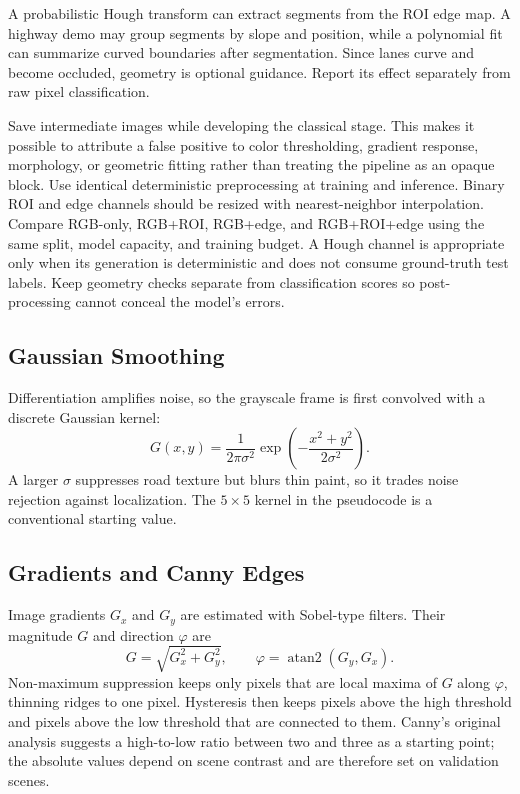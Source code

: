 \documentclass[10pt,a4paper,twocolumn]{article}
\begin{document}
A probabilistic Hough transform can extract segments from the ROI edge map. A highway demo may group segments by slope and position, while a polynomial fit can summarize curved boundaries after segmentation. Since lanes curve and become occluded, geometry is optional guidance. Report its effect separately from raw pixel classification.

Save intermediate images while developing the classical stage. This makes it possible to attribute a false positive to color thresholding, gradient response, morphology, or geometric fitting rather than treating the pipeline as an opaque block. Use identical deterministic preprocessing at training and inference. Binary ROI and edge channels should be resized with nearest-neighbor interpolation. Compare RGB-only, RGB+ROI, RGB+edge, and RGB+ROI+edge using the same split, model capacity, and training budget. A Hough channel is appropriate only when its generation is deterministic and does not consume ground-truth test labels. Keep geometry checks separate from classification scores so post-processing cannot conceal the model's errors.

\subsection{Gaussian Smoothing}
Differentiation amplifies noise, so the grayscale frame is first convolved with a discrete Gaussian kernel:
\begin{equation}
G(x,y)=\frac{1}{2\pi\sigma^{2}}\exp\!\left(-\frac{x^{2}+y^{2}}{2\sigma^{2}}\right).
\end{equation}
A larger $\sigma$ suppresses road texture but blurs thin paint, so it trades noise rejection against localization. The $5\times5$ kernel in the pseudocode is a conventional starting value.

\subsection{Gradients and Canny Edges}
Image gradients $G_x$ and $G_y$ are estimated with Sobel-type filters. Their magnitude $G$ and direction $\varphi$ are
\begin{equation}
G=\sqrt{G_x^{2}+G_y^{2}},\qquad \varphi=\operatorname{atan2}(G_y,G_x).
\end{equation}
Non-maximum suppression keeps only pixels that are local maxima of $G$ along $\varphi$, thinning ridges to one pixel. Hysteresis then keeps pixels above the high threshold and pixels above the low threshold that are connected to them. Canny's original analysis suggests a high-to-low ratio between two and three as a starting point; the absolute values depend on scene contrast and are therefore set on validation scenes.
\end{document}
